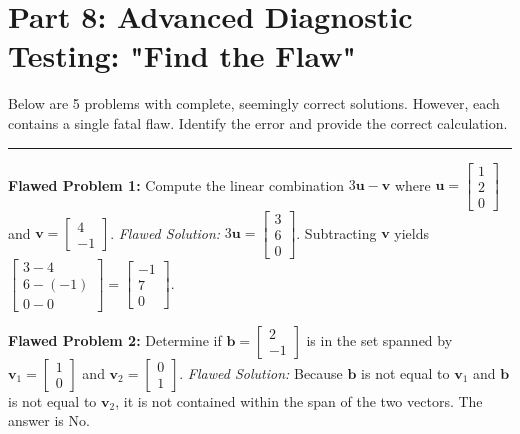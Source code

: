 \documentclass[11pt]{article}
\begin{document}
\newpage
\section{Part 8: Advanced Diagnostic Testing: "Find the Flaw"}

Below are 5 problems with complete, seemingly correct solutions. However, each contains a single fatal flaw. Identify the error and provide the correct calculation.

\hrule
\vspace{0.5cm}

\textbf{Flawed Problem 1:} Compute the linear combination $3\mathbf{u} - \mathbf{v}$ where $\mathbf{u} = \begin{bmatrix} 1 \\ 2 \\ 0 \end{bmatrix}$ and $\mathbf{v} = \begin{bmatrix} 4 \\ -1 \end{bmatrix}$.
\textit{Flawed Solution:} 
$3\mathbf{u} = \begin{bmatrix} 3 \\ 6 \\ 0 \end{bmatrix}$. Subtracting $\mathbf{v}$ yields $\begin{bmatrix} 3 - 4 \\ 6 - (-1) \\ 0 - 0 \end{bmatrix} = \begin{bmatrix} -1 \\ 7 \\ 0 \end{bmatrix}$.

\vspace{0.3cm}
\textbf{Flawed Problem 2:} Determine if $\mathbf{b} = \begin{bmatrix} 2 \\ -1 \end{bmatrix}$ is in the set spanned by $\mathbf{v}_1 = \begin{bmatrix} 1 \\ 0 \end{bmatrix}$ and $\mathbf{v}_2 = \begin{bmatrix} 0 \\ 1 \end{bmatrix}$.
\textit{Flawed Solution:} 
Because $\mathbf{b}$ is not equal to $\mathbf{v}_1$ and $\mathbf{b}$ is not equal to $\mathbf{v}_2$, it is not contained within the span of the two vectors. The answer is No.
\end{document}

